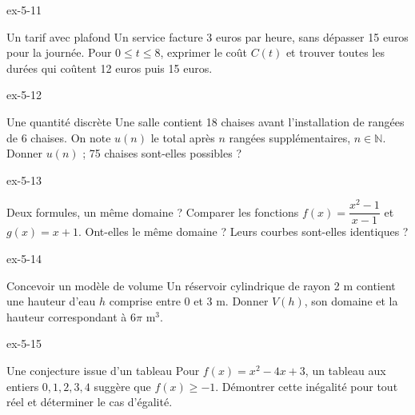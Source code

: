 \clearpage{}
\begin{blocLivre}{ex-5-11}
\begin{exercice}[3]{Un tarif avec plafond}
Un service facture 3 euros par heure, sans dépasser 15 euros pour la journée. Pour $0\le t\le8$, exprimer le coût $C(t)$ et trouver toutes les durées qui coûtent 12 euros puis 15 euros.
\label{fig-ex-5-11}
\end{exercice}
\end{blocLivre}
\begin{blocLivre}{ex-5-12}
\begin{exercice}[3]{Une quantité discrète}
Une salle contient 18 chaises avant l’installation de rangées de 6 chaises. On note $u(n)$ le total après $n$ rangées supplémentaires, $n\in\mathbb N$. Donner $u(n)$ ; 75 chaises sont-elles possibles ?
\end{exercice}
\end{blocLivre}
\begin{blocLivre}{ex-5-13}
\begin{exercice}[3]{Deux formules, un même domaine ?}
Comparer les fonctions $f(x)=\dfrac{x^2-1}{x-1}$ et $g(x)=x+1$. Ont-elles le même domaine ? Leurs courbes sont-elles identiques ?
\end{exercice}
\end{blocLivre}
\begin{blocLivre}{ex-5-14}
\begin{exercice}[3]{Concevoir un modèle de volume}
Un réservoir cylindrique de rayon 2 m contient une hauteur d’eau $h$ comprise entre 0 et 3 m. Donner $V(h)$, son domaine et la hauteur correspondant à $6\pi$ m$^3$.
\label{fig-ex-5-14}
\end{exercice}
\end{blocLivre}
\begin{blocLivre}{ex-5-15}
\begin{exercice}[3]{Une conjecture issue d’un tableau}
Pour $f(x)=x^2-4x+3$, un tableau aux entiers $0,1,2,3,4$ suggère que $f(x)\ge-1$. Démontrer cette inégalité pour tout réel et déterminer le cas d’égalité.
\end{exercice}
\end{blocLivre}

\clearpage
